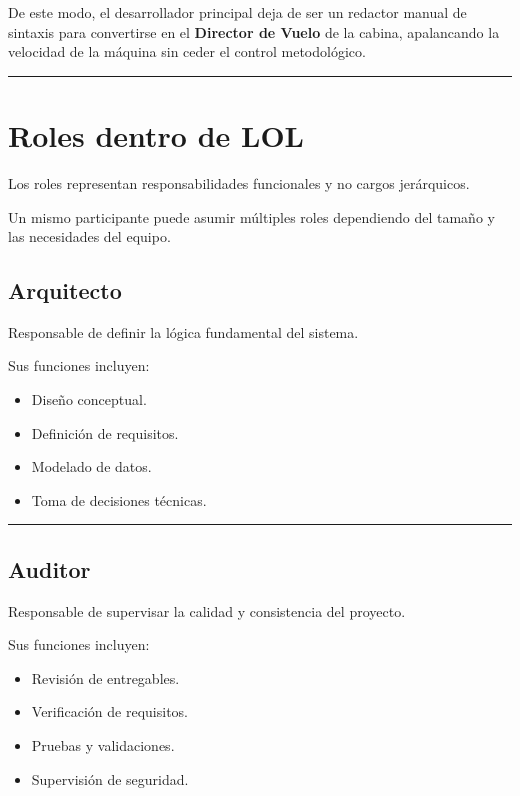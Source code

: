 \documentclass[14pt,a4paper,oneside]{extbook}
\begin{document}
De este modo, el desarrollador principal deja de ser un redactor manual de sintaxis para convertirse en el \textbf{Director de Vuelo} de la cabina, apalancando la velocidad de la máquina sin ceder el control metodológico.

\par\vspace{1.5em}\noindent\hfill\rule{0.25\textwidth}{0.6pt}\hfill\par\vspace{1.5em}

\section{Roles dentro de LOL}

Los roles representan responsabilidades funcionales y no cargos jerárquicos.

Un mismo participante puede asumir múltiples roles dependiendo del tamaño y las necesidades del equipo.

\subsection{Arquitecto}

Responsable de definir la lógica fundamental del sistema.

Sus funciones incluyen:

\begin{itemize}
\item Diseño conceptual.
\item Definición de requisitos.
\item Modelado de datos.
\item Toma de decisiones técnicas.
\end{itemize}

\par\vspace{1.5em}\noindent\hfill\rule{0.25\textwidth}{0.6pt}\hfill\par\vspace{1.5em}

\subsection{Auditor}

Responsable de supervisar la calidad y consistencia del proyecto.

Sus funciones incluyen:

\begin{itemize}
\item Revisión de entregables.
\item Verificación de requisitos.
\item Pruebas y validaciones.
\item Supervisión de seguridad.
\end{itemize}
\end{document}
